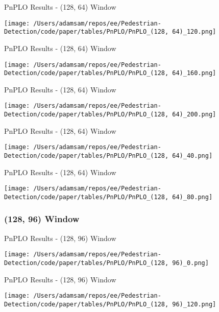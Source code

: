 \begin{table}
    \caption{PnPLO Results - (128, 64) Window}
    \texttt{[image: /Users/adamsam/repos/ee/Pedestrian-Detection/code/paper/tables/PnPLO/PnPLO\_(128, 64)\_120.png]}
    \label{tab:PnPLO_(128, 64)_120}
\end{table}

\begin{table}
    \caption{PnPLO Results - (128, 64) Window}
    \texttt{[image: /Users/adamsam/repos/ee/Pedestrian-Detection/code/paper/tables/PnPLO/PnPLO\_(128, 64)\_160.png]}
    \label{tab:PnPLO_(128, 64)_160}
\end{table}

\begin{table}
    \caption{PnPLO Results - (128, 64) Window}
    \texttt{[image: /Users/adamsam/repos/ee/Pedestrian-Detection/code/paper/tables/PnPLO/PnPLO\_(128, 64)\_200.png]}
    \label{tab:PnPLO_(128, 64)_200}
\end{table}

\begin{table}
    \caption{PnPLO Results - (128, 64) Window}
    \texttt{[image: /Users/adamsam/repos/ee/Pedestrian-Detection/code/paper/tables/PnPLO/PnPLO\_(128, 64)\_40.png]}
    \label{tab:PnPLO_(128, 64)_40}
\end{table}

\begin{table}
    \caption{PnPLO Results - (128, 64) Window}
    \texttt{[image: /Users/adamsam/repos/ee/Pedestrian-Detection/code/paper/tables/PnPLO/PnPLO\_(128, 64)\_80.png]}
    \label{tab:PnPLO_(128, 64)_80}
\end{table}

\subsubsection*{(128, 96) Window}

\begin{table}
    \caption{PnPLO Results - (128, 96) Window}
    \texttt{[image: /Users/adamsam/repos/ee/Pedestrian-Detection/code/paper/tables/PnPLO/PnPLO\_(128, 96)\_0.png]}
    \label{tab:PnPLO_(128, 96)_0}
\end{table}

\begin{table}
    \caption{PnPLO Results - (128, 96) Window}
    \texttt{[image: /Users/adamsam/repos/ee/Pedestrian-Detection/code/paper/tables/PnPLO/PnPLO\_(128, 96)\_120.png]}
    \label{tab:PnPLO_(128, 96)_120}
\end{table}

